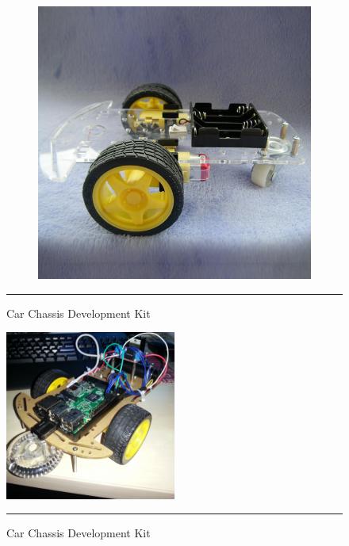 \begin{figure}[h!]
\begin{subfigure}[b]{0.5\textwidth}
                \includegraphics[width=\textwidth]{./Pictures/Car-Chassis-Kit2.jpg}
        \end{subfigure}
        \rule{1\textwidth}{1pt}
        \caption{Car Chassis Development Kit}
        \label{fig:car_chassis}
\end{figure}
\begin{figure}[h!]
        \centering
        \includegraphics[width=0.5\textwidth]{./Pictures/Car-Chassis-Kit3.jpg}
		\rule{0.5\textwidth}{1pt}
        \caption{Car Chassis Development Kit}
\end{figure}
\clearpage
